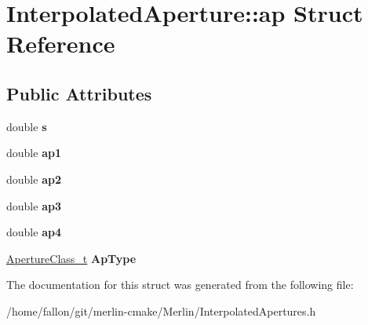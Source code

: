 \hypertarget{structInterpolatedAperture_1_1ap}{}\section{Interpolated\+Aperture\+:\+:ap Struct Reference}
\label{structInterpolatedAperture_1_1ap}
\subsection*{Public Attributes}
\begin{DoxyCompactItemize}
\item 
\mbox{\label{structInterpolatedAperture_1_1ap_a0759a9aa95c7a0e25336b26eb15ff4ca}} 
double {\bfseries s}
\item 
\mbox{\label{structInterpolatedAperture_1_1ap_a3d62c47aeda602381be5cef93f7e3025}} 
double {\bfseries ap1}
\item 
\mbox{\label{structInterpolatedAperture_1_1ap_a1b71fc032ac1b791ef2f77c6fb05caf2}} 
double {\bfseries ap2}
\item 
\mbox{\label{structInterpolatedAperture_1_1ap_ae23652da42c61ac5686612ff5ed05d34}} 
double {\bfseries ap3}
\item 
\mbox{\label{structInterpolatedAperture_1_1ap_afa60ba260c28653c614de5684146ebb9}} 
double {\bfseries ap4}
\item 
\mbox{\label{structInterpolatedAperture_1_1ap_ac986e548358501ff50a66e4dc5c1102e}} 
\hyperlink{classInterpolatedAperture_a39433c0172ff3f57ea3daefaff6fcc74}{Aperture\+Class\+\_\+t} {\bfseries Ap\+Type}
\end{DoxyCompactItemize}


The documentation for this struct was generated from the following file\+:\begin{DoxyCompactItemize}
\item 
/home/fallon/git/merlin-\/cmake/\+Merlin/Interpolated\+Apertures.\+h\end{DoxyCompactItemize}
